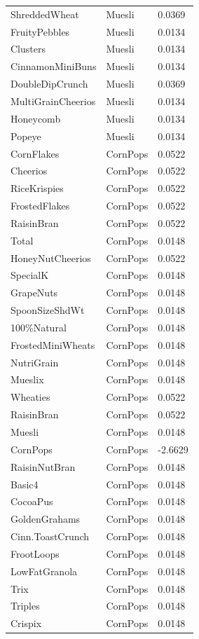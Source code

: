\begin{table}[!htbp]
\begin{tabular}{lll}
ShreddedWheat & Muesli & 0.0369
\\
FruityPebbles & Muesli & 0.0134
\\
Clusters & Muesli & 0.0134
\\
CinnamonMiniBuns & Muesli & 0.0134
\\
DoubleDipCrunch & Muesli & 0.0369
\\
MultiGrainCheerios & Muesli & 0.0134
\\
Honeycomb & Muesli & 0.0134
\\
Popeye & Muesli & 0.0134
\\
CornFlakes & CornPops & 0.0522
\\
Cheerios & CornPops & 0.0522
\\
RiceKrispies & CornPops & 0.0522
\\
FrostedFlakes & CornPops & 0.0522
\\
RaisinBran & CornPops & 0.0522
\\
Total & CornPops & 0.0148
\\
HoneyNutCheerios & CornPops & 0.0522
\\
SpecialK & CornPops & 0.0148
\\
GrapeNuts & CornPops & 0.0148
\\
SpoonSizeShdWt & CornPops & 0.0148
\\
100\%Natural & CornPops & 0.0148
\\
FrostedMiniWheats & CornPops & 0.0148
\\
NutriGrain & CornPops & 0.0148
\\
Mueslix & CornPops & 0.0148
\\
Wheaties & CornPops & 0.0522
\\
RaisinBran & CornPops & 0.0522
\\
Muesli & CornPops & 0.0148
\\
CornPops & CornPops & -2.6629
\\
RaisinNutBran & CornPops & 0.0148
\\
Basic4 & CornPops & 0.0148
\\
CocoaPus & CornPops & 0.0148
\\
GoldenGrahams & CornPops & 0.0148
\\
Cinn.ToastCrunch & CornPops & 0.0148
\\
FrootLoops & CornPops & 0.0148
\\
LowFatGranola & CornPops & 0.0148
\\
Trix & CornPops & 0.0148
\\
Triples & CornPops & 0.0148
\\
Crispix & CornPops & 0.0148

\end{tabular}
\end{table}
